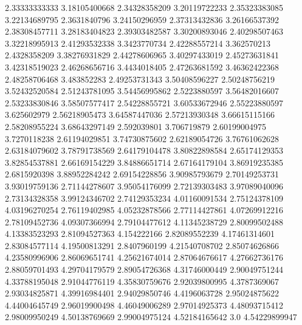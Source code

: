   2.33333333333    3.18105400668
  2.34328358209    3.20119722233
  2.35323383085    3.22134689795
   2.3631840796    3.24150296959
  2.37313432836    3.26166537392
  2.38308457711    3.28183404823
  2.39303482587    3.30200893046
  2.40298507463    3.32218995913
  2.41293532338     3.3423770734
  2.42288557214      3.362570213
   2.4328358209    3.38276931829
  2.44278606965    3.40297433019
  2.45273631841    3.42318519023
  2.46268656716     3.4434018405
  2.47263681592    3.46362422368
  2.48258706468      3.483852283
  2.49253731343    3.50408596227
  2.50248756219    3.52432520584
  2.51243781095    3.54456995862
   2.5223880597    3.56482016607
  2.53233830846    3.58507577417
  2.54228855721    3.60533672946
  2.55223880597      3.625602979
  2.56218905473    3.64587447036
  2.57213930348    3.66615115166
  2.58208955224    3.68643297149
    2.592039801      3.706719879
  2.60199004975     3.7270118238
  2.61194029851    3.74730875602
  2.62189054726    3.76761062628
  2.63184079602    3.78791738569
  2.64179104478    3.80822898584
  2.65174129353    3.82854537881
  2.66169154229    3.84886651714
  2.67164179104    3.86919235385
   2.6815920398    3.88952284242
  2.69154228856    3.90985793679
  2.70149253731    3.93019759136
  2.71144278607    3.95054176099
  2.72139303483    3.97089040096
  2.73134328358    3.99124346702
  2.74129353234    4.01160091534
  2.75124378109    4.03196270254
  2.76119402985    4.05232878566
  2.77114427861    4.07269912216
  2.78109452736    4.09307366994
  2.79104477612    4.11345238729
  2.80099502488    4.13383523293
  2.81094527363      4.154222166
  2.82089552239    4.17461314601
  2.83084577114    4.19500813291
   2.8407960199    4.21540708702
  2.85074626866    4.23580996906
  2.86069651741    4.25621674014
  2.87064676617    4.27662736176
  2.88059701493    4.29704179579
  2.89054726368    4.31746000449
  2.90049751244    4.33788195048
  2.91044776119    4.35830759676
  2.92039800995     4.3787369067
  2.93034825871    4.39916984401
  2.94029850746     4.4196063728
  2.95024875622    4.44004645749
  2.96019900498    4.46049006289
  2.97014925373    4.48093715412
  2.98009950249    4.50138769669
  2.99004975124    4.52184165642
            3.0    4.54229899947
